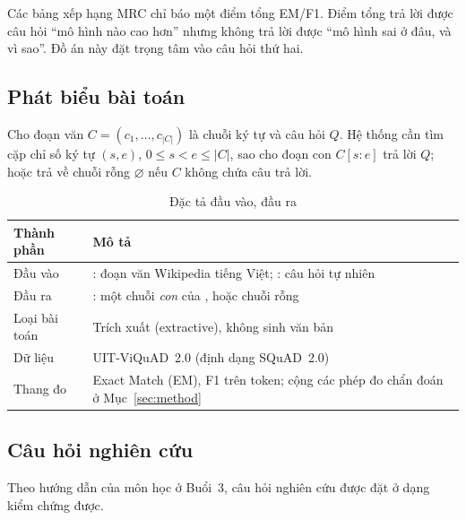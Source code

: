 Các bảng xếp hạng MRC chỉ báo một điểm tổng EM/F1. Điểm tổng trả lời được câu hỏi ``mô hình
nào cao hơn'' nhưng không trả lời được ``mô hình sai ở đâu, và vì sao''. Đồ án này đặt
trọng tâm vào câu hỏi thứ hai.

\subsection{Phát biểu bài toán}
\label{sec:problem}

Cho đoạn văn $C = (c_1, \dots, c_{|C|})$ là chuỗi ký tự và câu hỏi $Q$. Hệ thống cần tìm
cặp chỉ số ký tự $(s, e)$, $0 \le s < e \le |C|$, sao cho đoạn con $C[s{:}e]$ trả lời $Q$;
hoặc trả về chuỗi rỗng $\varnothing$ nếu $C$ không chứa câu trả lời.

\begin{table}[htbp]
\centering
\caption{Đặc tả đầu vào, đầu ra}
\label{tab:io}
\renewcommand{\arraystretch}{1.2}
\begin{tabularx}{\textwidth}{@{}l L@{}}
\toprule
\textbf{Thành phần} & \textbf{Mô tả} \\
\midrule
Đầu vào & : đoạn văn Wikipedia tiếng Việt; : câu hỏi tự nhiên \\
Đầu ra & : một chuỗi \emph{con} của , hoặc chuỗi rỗng \\
Loại bài toán & Trích xuất (extractive), không sinh văn bản \\
Dữ liệu & UIT-ViQuAD~2.0 (định dạng SQuAD~2.0) \\
Thang đo & Exact Match (EM), F1 trên token; cộng các phép đo chẩn đoán ở Mục~\ref{sec:method} \\
\bottomrule
\end{tabularx}
\end{table}

\subsection{Câu hỏi nghiên cứu}
\label{sec:rq}

Theo hướng dẫn của môn học ở Buổi~3, câu hỏi nghiên cứu được đặt ở dạng kiểm chứng được.

